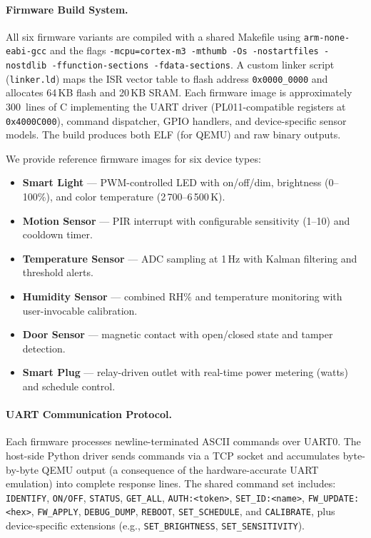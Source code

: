 \paragraph{Firmware Build System.}
All six firmware variants are compiled with a shared Makefile using
\texttt{arm-none-eabi-gcc} and the flags
\texttt{-mcpu=cortex-m3 -mthumb -Os -nostartfiles -nostdlib
-ffunction-sections -fdata-sections}.  A custom linker script
(\texttt{linker.ld}) maps the ISR vector table to flash address
\texttt{0x0000\_0000} and allocates 64\,KB flash and 20\,KB SRAM.
Each firmware image is approximately 300~lines of C implementing
the UART driver (PL011-compatible registers at \texttt{0x4000C000}),
command dispatcher, GPIO handlers, and device-specific sensor models.
The build produces both ELF (for QEMU) and raw binary outputs.

We provide reference firmware images for six device types:
\begin{itemize}[leftmargin=*]
  \item \textbf{Smart Light} --- PWM-controlled LED with on/off/dim,
    brightness (0--100\%), and color temperature
    (2\,700--6\,500\,K).
  \item \textbf{Motion Sensor} --- PIR interrupt with configurable
    sensitivity (1--10) and cooldown timer.
  \item \textbf{Temperature Sensor} --- ADC sampling at 1\,Hz with
    Kalman filtering and threshold alerts.
  \item \textbf{Humidity Sensor} --- combined RH\% and temperature
    monitoring with user-invocable calibration.
  \item \textbf{Door Sensor} --- magnetic contact with open/closed
    state and tamper detection.
  \item \textbf{Smart Plug} --- relay-driven outlet with real-time
    power metering (watts) and schedule control.
\end{itemize}

\paragraph{UART Communication Protocol.}
Each firmware processes newline-terminated ASCII commands over UART0.
The host-side Python driver sends commands via a TCP socket and
accumulates byte-by-byte QEMU output (a consequence of the
hardware-accurate UART emulation) into complete response lines.
The shared command set includes: \texttt{IDENTIFY}, \texttt{ON/OFF},
\texttt{STATUS}, \texttt{GET\_ALL}, \texttt{AUTH:<token>},
\texttt{SET\_ID:<name>}, \texttt{FW\_UPDATE:<hex>}, \texttt{FW\_APPLY},
\texttt{DEBUG\_DUMP}, \texttt{REBOOT}, \texttt{SET\_SCHEDULE}, and
\texttt{CALIBRATE}, plus device-specific extensions (e.g.,
\texttt{SET\_BRIGHTNESS}, \texttt{SET\_SENSITIVITY}).

